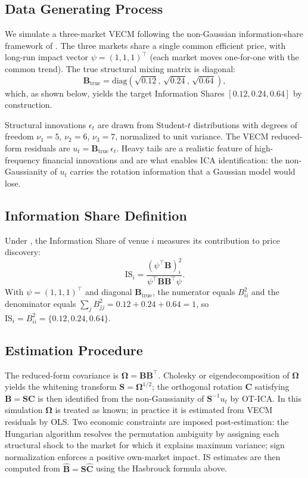 \documentclass{tpm2026} %
\begin{document}
\subsection{Data Generating Process}
We simulate a three-market VECM following the non-Gaussian information-share framework of \citet{zema2025}. The three markets share a single common efficient price, with long-run impact vector $\psi = (1, 1, 1)^\top$ (each market moves one-for-one with the common trend). The true structural mixing matrix is diagonal:
\begin{equation}
    \mathbf{B}_{\text{true}} = \mathrm{diag}\!\left(\sqrt{0.12},\, \sqrt{0.24},\, \sqrt{0.64}\right),
\end{equation}
which, as shown below, yields the target Information Shares $[0.12, 0.24, 0.64]$ by construction.

Structural innovations $\epsilon_t$ are drawn from Student-$t$ distributions with degrees of freedom $\nu_1 = 5$, $\nu_2 = 6$, $\nu_3 = 7$, normalized to unit variance. The VECM reduced-form residuals are $u_t = \mathbf{B}_{\text{true}}\,\epsilon_t$. Heavy tails are a realistic feature of high-frequency financial innovations and are what enables ICA identification: the non-Gaussianity of $u_t$ carries the rotation information that a Gaussian model would lose.

\subsection{Information Share Definition}
Under \citet{hasbrouck1995}, the Information Share of venue $i$ measures its contribution to price discovery:
\begin{equation}
    \mathrm{IS}_i = \frac{(\psi^\top \mathbf{B})_i^2}{\psi^\top \mathbf{B}\mathbf{B}^\top \psi}.
\end{equation}
With $\psi = (1,1,1)^\top$ and diagonal $\mathbf{B}_{\text{true}}$, the numerator equals $B_{ii}^2$ and the denominator equals $\sum_j B_{jj}^2 = 0.12 + 0.24 + 0.64 = 1$, so $\mathrm{IS}_i = B_{ii}^2 = \{0.12, 0.24, 0.64\}$.

\subsection{Estimation Procedure}
The reduced-form covariance is $\boldsymbol{\Omega} = \mathbf{B}\mathbf{B}^\top$. Cholesky or eigendecomposition of $\boldsymbol{\Omega}$ yields the whitening transform $\mathbf{S} = \boldsymbol{\Omega}^{1/2}$; the orthogonal rotation $\mathbf{C}$ satisfying $\mathbf{B} = \mathbf{S}\mathbf{C}$ is then identified from the non-Gaussianity of $\mathbf{S}^{-1}u_t$ by OT-ICA. In this simulation $\boldsymbol{\Omega}$ is treated as known; in practice it is estimated from VECM residuals by OLS. Two economic constraints are imposed post-estimation: the Hungarian algorithm \citep{kuhn1955hungarian} resolves the permutation ambiguity by assigning each structural shock to the market for which it explains maximum variance; sign normalization enforces a positive own-market impact. IS estimates are then computed from $\hat{\mathbf{B}} = \mathbf{S}\hat{\mathbf{C}}$ using the Hasbrouck formula above.
\end{document}
